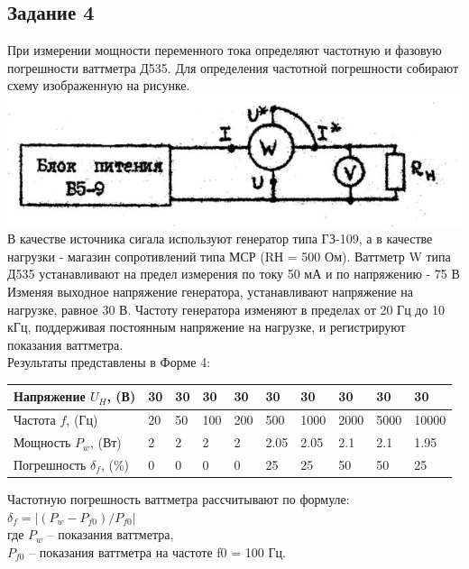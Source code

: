 \newpage

\subsection*{Задание 4}


	При измерении мощности переменного тока определяют частотную и фазовую погрешности 			ваттметра Д535. Для определения частотной погрешности собирают схему изображенную на 	рисунке. \\
	\vspace{1.5cm}
 	\includegraphics[width=\textwidth]{ch4.png}\\
 	
 	В качестве источника сигала используют генератор типа ГЗ-109, а в качестве нагрузки 		- магазин сопротивлений типа МСР (RН = 500 Ом). Ваттметр W типа Д535 устанавливают 			на предел измерения по току 50 мА и по напряжению - 75 В Изменяя выходное напряжение 	генератора, устанавливают напряжение на нагрузке, равное 30 В. Частоту генератора			изменяют в пределах от 20 Гц до 10 кГц, поддерживая постоянным напряжение на 				нагрузке, и регистрируют показания ваттметра.  \\
 	Результаты представлены в Форме 4:\\
 	
 	
 	\begin{table} [h!]
 	 \begin{tabular}{|p{4cm}|p{1cm}|p{1cm}|p{1cm}|p{1cm}|p{1cm}|p{1.2cm}|						p{1.2cm}|p{1.2cm}|p{1.2cm}|}
 	\hline
 	Напряжение $U_{H}$, (В) & 30 & 30 & 30 & 30 & 30 & 30 & 30 & 30 & 30 \\
 	\hline
 	Частота $f$, (Гц) & 20 & 50 & 100 & 200 & 500 & 1000 & 2000 & 5000 & 10000 \\
 	\hline
 	Мощность $P_{w}$, (Вт) & 2 & 2 & 2 & 2 & 2.05 & 2.05 & 2.1 & 2.1 & 1.95 \\
 	\hline
 	Погрешность $\delta _{f}$, (\%) & 0 & 0 & 0 & 0 & 25 & 25 & 50 & 50 & 25 \\
 	\hline
 	\end{tabular}
 	\end{table}
 	
 	
 	\vspace{1cm}
 	Частотную погрешность ваттметра рассчитывают по формуле:\\
 	$ \delta _{f} = |(P_{w} - P_{f0}) / P_{f0}| $ \\
 	где $P_{w}$ – показания ваттметра,\\
 	$P_{f0}$ – показания ваттметра на частоте f0 = 100 Гц.\\
 	
 	
  
  